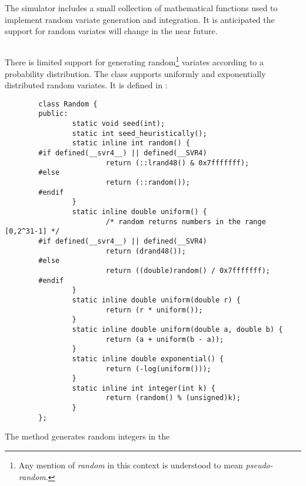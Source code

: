 %
%
\section{}

The simulator includes a small collection of mathematical
functions used to implement random variate generation and integration.
It is anticipated the support for random variates will
change in the near future.

\subsection{}

There is limited support for generating
random\footnote{Any mention of {\em random} in this context is
understood to mean {\em pseudo-random}.}
variates according to a probability distribution.
The  class supports uniformly and exponentially
distributed random variates.
It is defined in :
\begin{small}
\begin{verbatim}
        class Random {
        public:
                static void seed(int);
                static int seed_heuristically();
                static inline int random() {
        #if defined(__svr4__) || defined(__SVR4)
                        return (::lrand48() & 0x7fffffff);
        #else
                        return (::random());
        #endif
                }
                static inline double uniform() {
                        /* random returns numbers in the range [0,2^31-1] */
        #if defined(__svr4__) || defined(__SVR4)
                        return (drand48());
        #else
                        return ((double)random() / 0x7fffffff);
        #endif
                }
                static inline double uniform(double r) {
                        return (r * uniform());
                }
                static inline double uniform(double a, double b) {
                        return (a + uniform(b - a));
                }
                static inline double exponential() {
                        return (-log(uniform()));
                }
                static inline int integer(int k) {
                        return (random() % (unsigned)k);
                }
        };
\end{verbatim}
\end{small}
The  method generates random integers in the
